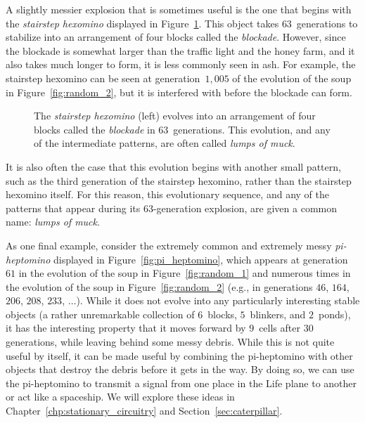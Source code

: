 A slightly messier explosion that is sometimes useful is the one that begins with the \emph{stairstep hexomino} displayed in Figure~\ref{fig:stairstep_hexomino}. This object takes $63$~generations to stabilize into an arrangement of four blocks called the \emph{blockade}. However, since the blockade is somewhat larger than the traffic light and the honey farm, and it also takes much longer to form, it is less commonly seen in ash. For example, the stairstep hexomino can be seen at generation~$1,005$ of the evolution of the soup in Figure~\ref{fig:random_2}, but it is interfered with before the blockade can form.

\begin{figure}[!htb]
	\centering
	\caption{The \emph{stairstep hexomino} (left) evolves into an arrangement of four blocks called the \emph{blockade} in $63$~generations. This evolution, and any of the intermediate patterns, are often called \emph{lumps of muck}.}\label{fig:stairstep_hexomino}
\end{figure}

It is also often the case that this evolution begins with another small pattern, such as the third generation of the stairstep hexomino, rather than the stairstep hexomino itself. For this reason, this evolutionary sequence, and any of the patterns that appear during its $63$-generation explosion, are given a common name: \emph{lumps of muck}.

As one final example, consider the extremely common and extremely messy \emph{pi-heptomino} displayed in Figure~\ref{fig:pi_heptomino}, which appears at generation~$61$ in the evolution of the soup in Figure~\ref{fig:random_1} and numerous times in the evolution of the soup in Figure~\ref{fig:random_2} (e.g., in generations $46$, $164$, $206$, $208$, $233$, $\ldots$). While it does not evolve into any particularly interesting stable objects (a rather unremarkable collection of $6$~blocks, $5$~blinkers, and $2$~ponds), it has the interesting property that it moves forward by $9$~cells after $30$ generations, while leaving behind some messy debris. While this is not quite useful by itself, it can be made useful by combining the pi-heptomino with other objects that destroy the debris before it gets in the way. By doing so, we can use the pi-heptomino to transmit a signal from one place in the Life plane to another or act like a spaceship. We will explore these ideas in Chapter~\ref{chp:stationary_circuitry} and Section~\ref{sec:caterpillar}.

